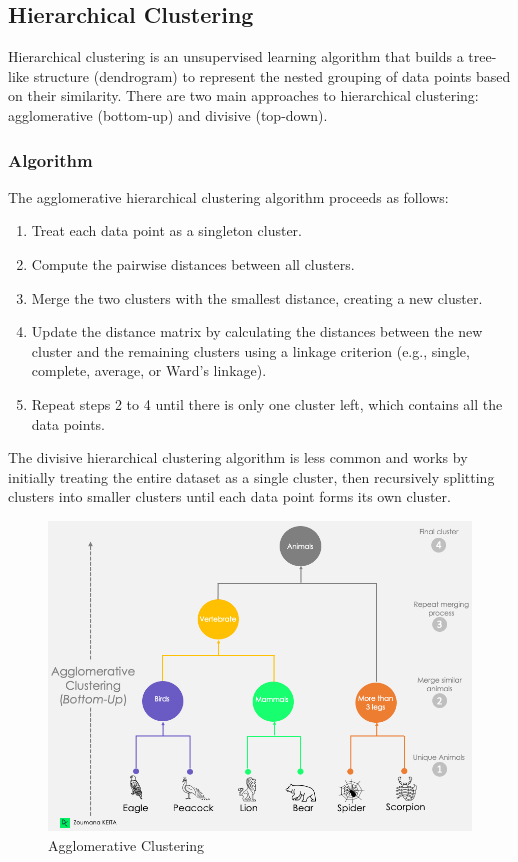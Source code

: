 \documentclass[12pt]{article}
\begin{document}
\subsection{Hierarchical Clustering}
Hierarchical clustering is an unsupervised learning algorithm that builds a tree-like structure (dendrogram) to represent the nested grouping of data points based on their similarity. There are two main approaches to hierarchical clustering: agglomerative (bottom-up) and divisive (top-down).

\subsubsection{Algorithm}
The agglomerative hierarchical clustering algorithm proceeds as follows:
\begin{enumerate}
\item Treat each data point as a singleton cluster.
\item Compute the pairwise distances between all clusters.
\item Merge the two clusters with the smallest distance, creating a new cluster.
\item Update the distance matrix by calculating the distances between the new cluster and the remaining clusters using a linkage criterion (e.g., single, complete, average, or Ward's linkage).
\item Repeat steps 2 to 4 until there is only one cluster left, which contains all the data points.
\end{enumerate}

The divisive hierarchical clustering algorithm is less common and works by initially treating the entire dataset as a single cluster, then recursively splitting clusters into smaller clusters until each data point forms its own cluster.

\begin{figure}[h]
    \centering
    \includegraphics[scale=0.4]{./media/agg_clustering.png}
    \caption{Agglomerative Clustering}
    \label{fig:svm}
\end{figure}
\end{document}
